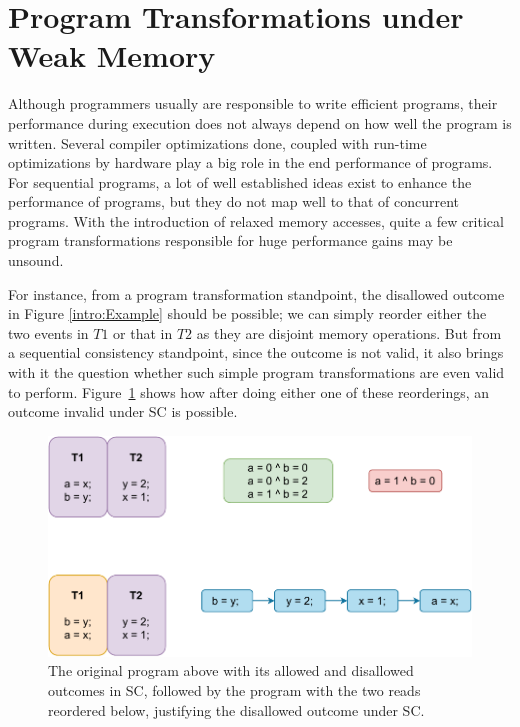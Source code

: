 \section{Program Transformations under Weak Memory}

    Although programmers usually are responsible to write efficient programs, their performance during execution does not always depend on how well the program is written. 
    Several compiler optimizations done, coupled with run-time optimizations by hardware play a big role in the end performance of programs.
    For sequential programs, a lot of well established ideas exist to enhance the performance of programs, but they do not map well to that of concurrent programs. 
    With the introduction of relaxed memory accesses, quite a few critical program transformations responsible for huge performance gains may be unsound. 

    For instance, from a program transformation standpoint, the disallowed outcome in Figure \ref{intro:Example} should be possible; we can simply reorder either the two events in $T1$ or that in $T2$ as they are disjoint memory operations. 
    But from a sequential consistency standpoint, since the outcome is not valid, it also brings with it the question whether such simple program transformations are even valid to perform.
    Figure~\ref{intro:Example2} shows how after doing either one of these reorderings, an outcome invalid under SC is possible. 
    \begin{figure}[H]
        \centering
        \includegraphics[scale=0.7]{2.Background/SC_Example1(b).pdf}
        \caption{The original program above with its allowed and disallowed outcomes in SC, followed by the program with the two reads reordered below, justifying the disallowed outcome under SC.}
        \label{intro:Example2}
    \end{figure}

